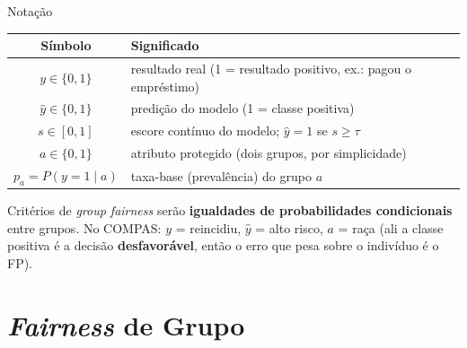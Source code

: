 \documentclass[aspectratio=169,xcolor=dvipsnames]{beamer}
\begin{document}
  \begin{frame}{Notação}
    \centering
    \renewcommand{\arraystretch}{1.4}
    \begin{tabular}{cl}
      \toprule
      \textbf{Símbolo} & \textbf{Significado} \\
      \midrule
      $y \in \{0, 1\}$ & resultado real (1 = resultado positivo, ex.: pagou o empréstimo) \\
      $\hat{y} \in \{0, 1\}$ & predição do modelo (1 = classe positiva) \\
      $s \in [0, 1]$ & escore contínuo do modelo; $\hat{y} = 1$ se $s \geq \tau$ \\
      $a \in \{0, 1\}$ & atributo protegido (dois grupos, por simplicidade) \\
      $p_a = P(y{=}1 \mid a)$ & taxa-base (prevalência) do grupo $a$ \\
      \bottomrule
    \end{tabular}

    \vspace{0.7em}
    \raggedright
    Critérios de \textit{group fairness} serão \textbf{igualdades de probabilidades condicionais} entre grupos. No COMPAS: $y$ = reincidiu, $\hat{y}$ = alto risco, $a$ = raça (ali a classe positiva é a decisão \textbf{desfavorável}, então o erro que pesa sobre o indivíduo é o FP).
  \end{frame}

  \section{\textit{Fairness} de Grupo}
\end{document}
